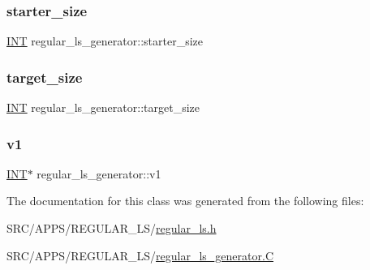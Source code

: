 \subsubsection{\texorpdfstring{starter\+\_\+size}{starter\_size}}
{\footnotesize\ttfamily \mbox{\hyperlink{galois_8h_a09fddde158a3a20bd2dcadb609de11dc}{I\+NT}} regular\+\_\+ls\+\_\+generator\+::starter\+\_\+size}

\mbox{\label{classregular__ls__generator_a7cf78c612a26e7a4f5b4e917ecf56fee}} 
\subsubsection{\texorpdfstring{target\+\_\+size}{target\_size}}
{\footnotesize\ttfamily \mbox{\hyperlink{galois_8h_a09fddde158a3a20bd2dcadb609de11dc}{I\+NT}} regular\+\_\+ls\+\_\+generator\+::target\+\_\+size}

\mbox{\label{classregular__ls__generator_afed92ea43d113c07963c550a7ac187d3}} 
\subsubsection{\texorpdfstring{v1}{v1}}
{\footnotesize\ttfamily \mbox{\hyperlink{galois_8h_a09fddde158a3a20bd2dcadb609de11dc}{I\+NT}}$\ast$ regular\+\_\+ls\+\_\+generator\+::v1}



The documentation for this class was generated from the following files\+:\begin{DoxyCompactItemize}
\item 
S\+R\+C/\+A\+P\+P\+S/\+R\+E\+G\+U\+L\+A\+R\+\_\+\+L\+S/\mbox{\hyperlink{regular__ls_8h}{regular\+\_\+ls.\+h}}\item 
S\+R\+C/\+A\+P\+P\+S/\+R\+E\+G\+U\+L\+A\+R\+\_\+\+L\+S/\mbox{\hyperlink{regular__ls__generator_8_c}{regular\+\_\+ls\+\_\+generator.\+C}}\end{DoxyCompactItemize}
